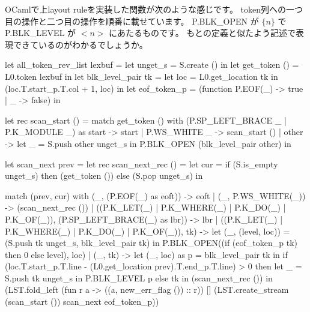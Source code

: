 \documentclass[mingoth,a4paper]{jsarticle}
\begin{document}
OCamlで上layout ruleを実装した関数が次のような感じです。
token列への一つ目の操作と二つ目の操作を順番に載せています。
P.BLK\_OPEN が $\{n\}$ で P.BLK\_LEVEL が $<n>$ にあたるものです。
もとの定義と似たよう記述で表現できているのがわかるでしょうか。

\begin{commandline}
let all_token_rev_list lexbuf =
  let unget_s = S.create () in
  let get_token () = L0.token lexbuf in
  let blk_level_pair tk =
    let loc = L0.get_location tk in (loc.T.start_p.T.col + 1, loc) in
  let eof_token_p = (function P.EOF(_) -> true | _ -> false) in

  let rec scan_start () =
    match get_token () with
        (P.SP_LEFT_BRACE _ | P.K_MODULE _) as start -> start
      | P.WS_WHITE _ -> scan_start ()
      | other ->
          let _ = S.push other unget_s in
            P.BLK_OPEN (blk_level_pair other)
  in

  let scan_next prev = 
    let rec scan_next_rec () =
      let cur =
        if (S.is_empty unget_s) then (get_token ())
        else (S.pop unget_s) in

        match (prev, cur) with
            (_, (P.EOF(_) as eoft)) -> eoft
          | (_, P.WS_WHITE(_)) -> (scan_next_rec ())
          | ((P.K_LET(_) | P.K_WHERE(_) | P.K_DO(_) | P.K_OF(_)), (P.SP_LEFT_BRACE(_) as lbr)) -> lbr
          | ((P.K_LET(_) | P.K_WHERE(_) | P.K_DO(_) | P.K_OF(_)), tk) ->
              let (_, (level, loc)) = (S.push tk unget_s, blk_level_pair tk) in
                P.BLK_OPEN((if (eof_token_p tk) then 0 else level), loc)
          | (_, tk) ->
              let (_, loc) as p = blk_level_pair tk in
                if (loc.T.start_p.T.line
                    - (L0.get_location prev).T.end_p.T.line) > 0 then
                  let _ = S.push tk unget_s in P.BLK_LEVEL p
                else tk
    in (scan_next_rec ())
  in
    (LST.fold_left
       (fun r a -> ((a, new_err_flag ()) :: r))
       []
       (LST.create_stream (scan_start ()) scan_next eof_token_p))
\end{commandline}
\end{document}
